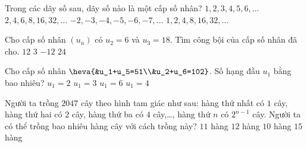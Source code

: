\begin{ex}%
	Trong các dãy số sau, dãy số  nào là một cấp số nhân?
	\choice 
		 {$1, 2, 3, 4, 5, 6, \ldots$}
		{$2, 4, 6,  8, 16, 32,\ldots$}
		{$-2, -3, -4, -5, -6, -7,  \ldots$}
		{\True $1, 2, 4,  8, 16, 32, \ldots$}
\end{ex}

\begin{ex}%
	Cho cấp số nhân $\left(u_n\right)$ có $u_2=6$  và $u_3=18$. Tìm công bội của cấp số nhân đã cho.
	\choice 
		 {$12$}
		{\True  $3$}
		{$-12$} 
		 {$24$}
\end{ex}

\begin{ex}%
	Cho cấp số nhân $\heva{&u_1+u_5=51\\&u_2+u_6=102}$. Số hạng đầu $u_1$ bằng  bao nhiêu?
	 \choice
		{$u_1  =2$}
		{\True $u_1 =3$} 
		 {$u_1 =6$}
		{$u_1  =4$}
\end{ex}

\begin{ex}%
	Người ta trồng $2047$ cây theo hình tam giác như sau: hàng thứ nhất có $1$ cây,  hàng thứ hai có $2$ cây, hàng thứ ba có $4$ cây,\ldots , hàng thứ $n$ có $2^{n-1}$ cây. Người ta có thể trồng bao nhiêu hàng cây với cách trồng này?
	\choice 
		{\True $11$  hàng}
		{$12$  hàng}
		 {$10$ hàng}
		 {$15$ hàng}
\end{ex}


